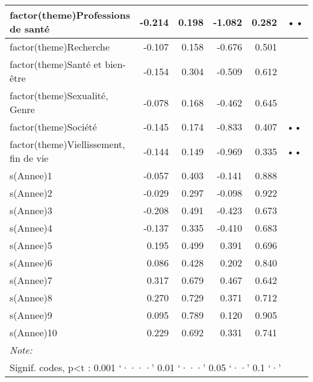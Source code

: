 \documentclass[
  letterpaper,
  DIV=11,
  numbers=noendperiod]{scrartcl}
\begin{document}
\begin{table}
\begin{minipage}[t]{\linewidth}
{\begin{tabular}[t]{l|r|r|r|r|l}
\hline
factor(theme)Professions de santé & -0.214 & 0.198 & -1.082 & 0.282 & ••\\
\hline
factor(theme)Recherche & -0.107 & 0.158 & -0.676 & 0.501 & \\
\hline
factor(theme)Santé et bien-être & -0.154 & 0.304 & -0.509 & 0.612 & \\
\hline
factor(theme)Sexualité, Genre & -0.078 & 0.168 & -0.462 & 0.645 & \\
\hline
factor(theme)Société & -0.145 & 0.174 & -0.833 & 0.407 & ••\\
\hline
factor(theme)Viellissement, fin de vie & -0.144 & 0.149 & -0.969 & 0.335 & ••\\
\hline
s(Annee)1 & -0.057 & 0.403 & -0.141 & 0.888 & \\
\hline
s(Annee)2 & -0.029 & 0.297 & -0.098 & 0.922 & \\
\hline
s(Annee)3 & -0.208 & 0.491 & -0.423 & 0.673 & \\
\hline
s(Annee)4 & -0.137 & 0.335 & -0.410 & 0.683 & \\
\hline
s(Annee)5 & 0.195 & 0.499 & 0.391 & 0.696 & \\
\hline
s(Annee)6 & 0.086 & 0.428 & 0.202 & 0.840 & \\
\hline
s(Annee)7 & 0.317 & 0.679 & 0.467 & 0.642 & \\
\hline
s(Annee)8 & 0.270 & 0.729 & 0.371 & 0.712 & \\
\hline
s(Annee)9 & 0.095 & 0.789 & 0.120 & 0.905 & \\
\hline
s(Annee)10 & 0.229 & 0.692 & 0.331 & 0.741 & \\
\hline
\multicolumn{6}{l}{\rule{0pt}{1em}\textit{Note: }}\\
\multicolumn{6}{l}{\rule{0pt}{1em}Signif. codes, p<t : 0.001 ‘····’ 0.01 ‘···’ 0.05 ‘··’ 0.1 ‘·’ }\\
\end{tabular}

}

\end{minipage}%
\newline
\begin{minipage}[t]{\linewidth}

{\centering 

}
\end{minipage}
\end{table}
\end{document}
